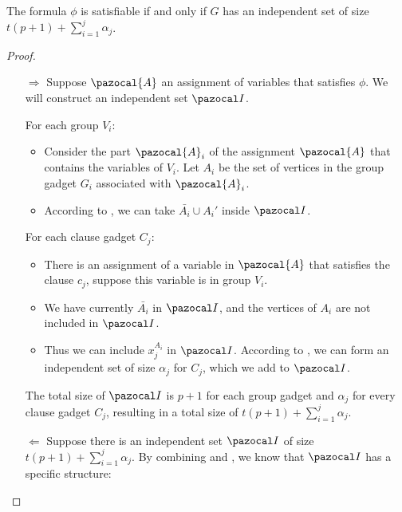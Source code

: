 

\begin{lemma}
    \label{lemma:indset-sat-graph-equiv}
    The formula $\phi$ is satisfiable if and only if $G$ has an independent set of size $t(p+1) + \sum_{i = 1}^j \alpha_j$.
\end{lemma}

\begin{proof}
    \begin{itemize}
        \item [$\Rightarrow$] Suppose $\pazocal{A}$ an assignment of variables that satisfies $\phi$. We will construct an independent set $\I$.
        
        For each group $V_i$:
        \begin{itemize}
            \item Consider the part $\pazocal{A}_i$ of the assignment $\pazocal{A}$ that contains the variables of $V_i$. Let $A_i$ be the set of vertices in the group gadget $G_i$ associated with $\pazocal{A}_i$.
            \item According to , we can take $\bar{A_i} \cup A_i'$ inside $\I$.
        \end{itemize}
        For each clause gadget $C_j$:
        \begin{itemize}
            \item There is an assignment of a variable in $\pazocal{A}$ that satisfies the clause $c_j$, suppose this variable is in group $V_i$.
            \item We have currently $\bar{A_i}$ in $\I$, and the vertices of $A_i$ are not included in $\I$.
            \item Thus we can include $x_j^{A_i}$ in $\I$. According to , we can form an independent set of size $\alpha_j$ for $C_j$, which we add to $\I$.
        \end{itemize}
        
        \medskip

        The total size of $\I$ is $p+1$ for each group gadget and $\alpha_j$ for every clause gadget $C_j$, resulting in a total size of $t(p+1) + \sum_{i = 1}^j \alpha_j$.

        \item [$\Leftarrow$] Suppose there is an independent set $\I$ of size $t(p+1) + \sum_{i = 1}^j \alpha_j$. By combining  and , we know that $\I$ has a specific structure:
        

\end{itemize}
\end{proof}
